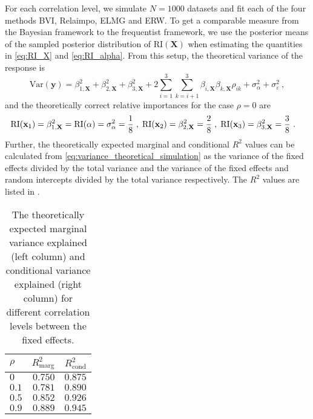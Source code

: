 For each correlation level, we simulate $N=1000$ datasets and fit each of the four methods BVI, Relaimpo, ELMG and ERW.
To get a comparable measure from the Bayesian framework to the frequentist framework, we use the posterior means of the sampled posterior distribution of $\text{RI}(\mathbf{X})$ when estimating the quantities in  \eqref{eq:RI_X} and \eqref{eq:RI_alpha}.
\newline
\newline
From this setup, the theoretical variance of the response is
\begin{equation}
    \label{eq:variance_theoretical_simulation}
    \text{Var}(\mathbf{y}) = \beta_{1, \mathbf{X}}^2 + \beta_{2, \mathbf{X}}^2 + \beta_{3, \mathbf{X}}^2 + 2\sum_{i=1}^{3}\sum_{k=i+1}^{3} \beta_{i, \mathbf{X}}\beta_{k, \mathbf{X}}\rho_{ik} + \sigma_{\alpha}^2 + \sigma^2_{\varepsilon} \ , 
\end{equation}
and the theoretically correct relative importances for the case $\rho=0$ are
\begin{equation}
    \label{eq:RI_theoretical_simulation}
    \begin{aligned}
        \text{RI}(\mathbf{x}_1) =  \beta_{1, \mathbf{X}}^2& = \text{RI}(\alpha) = \sigma^2_{\alpha} = \frac{1}{8} \hspace{1mm}, \hspace{1mm} \text{RI}(\mathbf{x}_2) = \beta_{2, \mathbf{X}}^2 = \frac{2}{8} \hspace{1mm}, \hspace{1mm} \text{RI}(\mathbf{x}_3) = \beta_{3, \mathbf{X}}^2 = \frac{3}{8} \ . 
    \end{aligned}
\end{equation}
Further, the theoretically expected marginal and conditional $R^2$ values can be calculated from \ref{eq:variance_theoretical_simulation} as the variance of the fixed effects divided by the total variance and the variance of the fixed effects and random intercepts divided by the total variance respectively. 
The $R^2$ values are listed in .
\begin{table}[H]
    \centering
    \begin{tabular}{lrr}
    \hline
    $\rho$ & $R^2_{\text{marg}}$ & $R^2_{\text{cond}}$\\ 
    \hline
    $0$ & $0.750$ &  $0.875$ \\ 
    $0.1$ & $0.781$ & $0.890$ \\ 
    $0.5$ & $0.852$ & $0.926$\\ 
    $0.9$ & $0.889$ & $0.945$\\ 
    \hline
    \end{tabular}
    \caption[Expected $R^2$ for Gaussian LMM]{The theoretically expected marginal variance explained (left column) and conditional variance explained (right column) for different correlation levels between the fixed effects.}
    \label{table:2}
\end{table}
